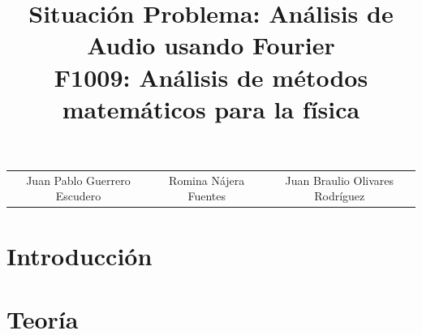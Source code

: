 \documentclass[12pt, letterpaper]{article}
\title{%
  Situación Problema: Análisis de Audio usando Fourier \\
  \large F1009: Análisis de métodos matemáticos para la física}
\begin{document}
\maketitle

\begin{tabular}{ccc}
Juan Pablo Guerrero Escudero & Romina Nájera Fuentes & Juan Braulio Olivares Rodríguez
\end{tabular}

\section*{Introducción}

\section*{Teoría}
\end{document}
